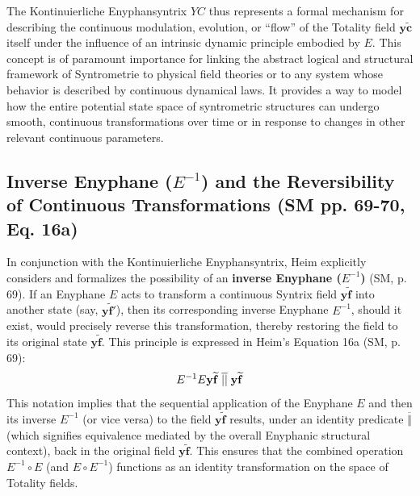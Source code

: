 \documentclass[
    12pt,              %
    a4paper,           %
    headings=normal,   %
    twoside=true,      %
    BCOR=8mm,          %
]{scrbook}
\newcommand{\q}[1]{\enquote{#1}}
\newcommand{\kontinuierlicheEnyphansyntrix}{YC}
\newcommand{\enyphane}{E}
\begin{document}
The Kontinuierliche Enyphansyntrix \(\kontinuierlicheEnyphansyntrix\) thus represents a formal mechanism for describing the continuous modulation, evolution, or \q{flow} of the Totality field \(\bm{y\widetilde{c}}\) itself under the influence of an intrinsic dynamic principle embodied by \(\enyphane\). This concept is of paramount importance for linking the abstract logical and structural framework of Syntrometrie to physical field theories or to any system whose behavior is described by continuous dynamical laws. It provides a way to model how the entire potential state space of syntrometric structures can undergo smooth, continuous transformations over time or in response to changes in other relevant continuous parameters.

\subsection{Inverse Enyphane (\(\enyphane^{-1}\)) and the Reversibility of Continuous Transformations (SM pp. 69-70, Eq. 16a)}
\label{sec:ch4_inverse_enyphane_revised_2}

In conjunction with the Kontinuierliche Enyphansyntrix, Heim explicitly considers and formalizes the possibility of an \textbf{inverse Enyphane (\(\enyphane^{-1}\))} (SM, p. 69). If an Enyphane \(\enyphane\) acts to transform a continuous Syntrix field \(\bm{y\widetilde{f}}\) into another state (say, \(\bm{y\widetilde{f}}'\)), then its corresponding inverse Enyphane \(\enyphane^{-1}\), should it exist, would precisely reverse this transformation, thereby restoring the field to its original state \(\bm{y\widetilde{f}}\). This principle is expressed in Heim’s Equation 16a (SM, p. 69):
\begin{equation} \label{eq:original_inverse_enyphane_revised_2} 
\enyphane^{-1} \enyphane \mathbf{y\widetilde{f}} \;\overline{||\vphantom{g}}\; \mathbf{y\widetilde{f}}
\end{equation}
This notation implies that the sequential application of the Enyphane \(\enyphane\) and then its inverse \(\enyphane^{-1}\) (or vice versa) to the field \(\bm{y\widetilde{f}}\) results, under an identity predicate \(\overline{\Vert}\) (which signifies equivalence mediated by the overall Enyphanic structural context), back in the original field \(\bm{y\widetilde{f}}\). This ensures that the combined operation \(\enyphane^{-1} \circ \enyphane\) (and \(\enyphane \circ \enyphane^{-1}\)) functions as an identity transformation on the space of Totality fields.
\end{document}

